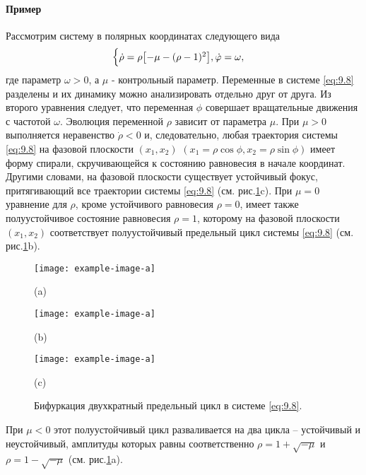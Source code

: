 \paragraph{Пример}%
Рассмотрим систему в полярных координатах следующего вида
\begin{equation}
        \label{eq:9.8}
        \begin{cases}
                \dot \rho = \rho\qty[ - \mu - (\rho-1)^2],
                \dot {\varphi} = \omega,
        \end{cases}
\end{equation}
где параметр $\omega>0$, а $\mu$ - контрольный параметр. Переменные в системе \eqref{eq:9.8}
разделены и их динамику можно анализировать отдельно друг от друга.
Из второго уравнения следует, что переменная $\phi$ совершает вращательные движения с частотой $\omega$. Эволюция переменной $\rho$ зависит от параметра $\mu$. При $\mu>0$ выполняется неравенство
$\dot \rho<0$ и, следовательно, любая траектория системы \eqref{eq:9.8} на фазовой плоскости $(x_1,x_2)$ $(x_1=\rho\cos \phi, x_2=\rho\sin \phi)$ имеет форму спирали, скручивающейся к состоянию
равновесия в начале координат.
Другими словами, на фазовой плоскости существует устойчивый фокус, притягивающий все 
траектории системы \eqref{eq:9.8} (см. рис.\ref{fig:9.4}c). При $\mu=0$ уравнение для $\rho$, кроме 
устойчивого равновесия $\rho=0$, имеет также полуустойчивое состояние равновесия $\rho=1$, которому на фазовой плоскости $(x_1,x_2)$ соответствует полуустойчивый предельный цикл системы \eqref{eq:9.8}
(см. рис.\ref{fig:9.4}b).
\begin{figure}[h]
        \centering
        \begin{minipage}{0.33\linewidth}
                \centering
                \texttt{[image: example-image-a]}

                (a)
        \end{minipage}
        \vfill
        \begin{minipage}{0.33\linewidth}
                \centering
                \texttt{[image: example-image-a]}
  
                (b)
        \end{minipage}
        \vfill
        \begin{minipage}{0.33\linewidth}
                \centering
                \texttt{[image: example-image-a]}

                (c)
        \end{minipage}
        \vfill
        \caption{Бифуркация двухкратный предельный цикл в системе \eqref{eq:9.8}.}
        \label{fig:9.4}
\end{figure}
При $\mu<0$ этот полуустойчивый цикл разваливается на два цикла -- устойчивый и неустойчивый,
амплитуды которых равны соответственно $\rho=1 + \sqrt{-\mu}$ и $\rho = 1 - \sqrt{-\mu}$ 
(см. рис.\ref{fig:9.4}a).

